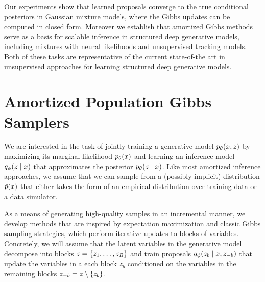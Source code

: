 \documentclass{article}
\theoremstyle{definition}
\begin{document}
Our experiments show that learned proposals converge to the true conditional posteriors in Gaussian mixture models, where the Gibbs updates can be computed in closed form. Moreover we establish that amortized Gibbs methods serve as a basis for scalable inference in structured deep generative models, including mixtures with neural likelihoods and unsupervised tracking models. Both of these tasks are representative of the current state-of-the art in unsupervised approaches for learning structured deep generative models.

\section{Amortized Population Gibbs Samplers}
\label{sec:amortized-gibbs}
We are interested in the task of jointly training a generative model $p_\theta(x, z)$ by maximizing its marginal likelihood $p_\theta(x)$ and learning an inference model $q_\phi(z \mid x)$ that approximates the posterior $p_\theta(z \mid x)$. Like most amortized inference approaches, we assume that we can sample from a (possibly implicit) distribution $\hat{p}(x)$ that either takes the form of an empirical distribution over training data or a data simulator.

As a means of generating high-quality samples in an incremental manner, we develop methods that are inspired by expectation maximization and classic Gibbs sampling strategies, which perform iterative updates to blocks of variables. Concretely, we will assume that the latent variables in the generative model decompose into blocks $z = \{z_1, \ldots, z_B\}$ and train proposals $q_\phi(z_b \mid x, z_{-b})$ that update the variables in a each block $z_{b}$ conditioned on the variables in the remaining blocks $z_{-b} = z \setminus \{z_b\}$.
\end{document}
